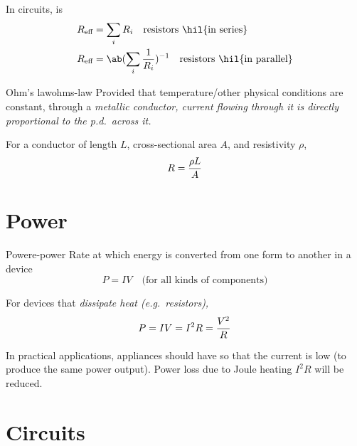 In circuits,  is
\begin{align*}
	R_\text{eff} & = \sum_i R_i \quad\text{resistors \hil{in series}}                    \\
	R_\text{eff} & = \ab(\sum_i \f{1}{R_i})^{-1} \quad\text{resistors \hil{in parallel}}
\end{align*}

\begin{definition}{Ohm's law}{ohms-law}
	Provided that temperature/other physical conditions are constant,
	through a \it{metallic conductor},
	current flowing through it is directly proportional to the p.d.~across it.
\end{definition}

For a conductor of length \(L\), cross-sectional area \(A\), and resistivity \(\rho\),
\[R = \frac{\rho L}{A}\]

\section{Power}
\begin{definition}{Power}{e-power}
	Rate at which energy is converted from one form to another in a device
	\[P = IV \quad \text{(for all kinds of components)}\]
\end{definition}
For devices that \it{dissipate heat} (e.g.~resistors),
\[P = IV = I^2 R = \frac{V^2}{R}\]

In practical applications, appliances should have 
so that the current is low (to produce the same power output).
Power loss due to Joule heating \(I^2R\) will be reduced.

\section{Circuits}
